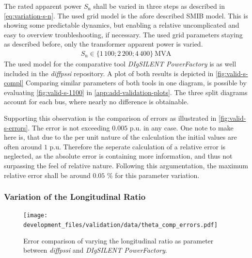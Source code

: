 The rated apparent power $S_\mathrm{n}$ shall be varied in three steps as described in \autoref{eq:variation-s-n}. 
The used grid model is the afore described \acs{SMIB} model. 
This is showing some predictable dynamics, but enabling a relative uncomplicated and easy to overview troubleshooting, if necessary.
The used grid parameters staying as described before, only the transformer apparent power is varied.
\begin{align}
    S_\mathrm{n} \in \{ 1\,100; 2\,200; 4\,400 \}~\mathrm{MVA} \label{eq:variation-s-n}
\end{align}
The used model for the comparative tool \textit{DIgSILENT PowerFactory} is as well included in the \textit{diffpssi} repository.
A plot of both results is depicted in \autoref{fig:valid-s-compl}
Comparing similar parameters of both tools in one diagram, is possible by evaluating \autoref{fig:valid-s-1100} in \autoref{app:add-validation-plots}.
The three split diagrams account for each bus, where nearly no difference is obtainable.

Supporting this observation is the comparison of errors as illustrated in \autoref{fig:valid-s-errors}.
The error is not exceeding $0.005$ p.u. in any case.
One note to make here is, that due to the per unit nature of the calculation the initial values are often around $1$ p.u.
Therefore the seperate calculation of a relative error is neglected, as the absolute error is containing more information, and thus not surpassing the feel of relative nature.
Following this argumentation, the maximum relative error shall be around $0.05$ \% for this parameter variation.

\subsubsection{Variation of the Longitudinal Ratio}

\begin{figure}[htbp!]
    \centering
    \texttt{[image: development\_files/validation/data/theta\_comp\_errors.pdf]}
    \caption{Error comparison of varying the longitudinal ratio as parameter between \textit{diffpssi} and \textit{DIgSILENT PowerFactory}.}
    \label{fig:valid-ratio-errors}
\end{figure}

